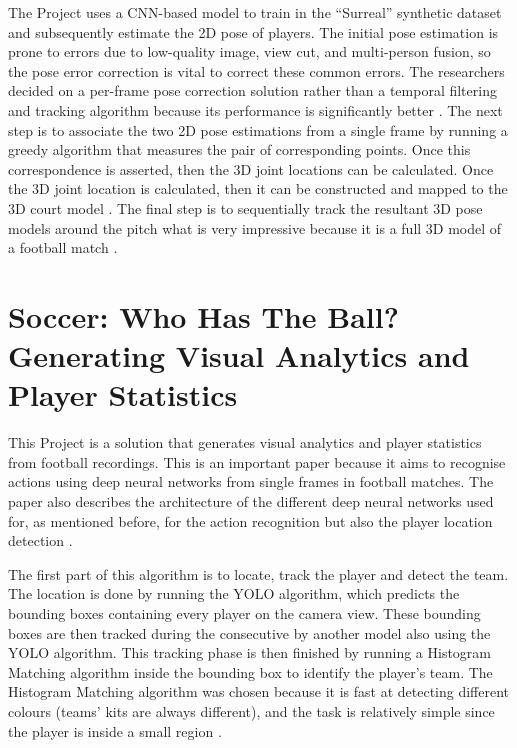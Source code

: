 \documentclass[
11pt,
twoside
]{report}
\begin{document}
The Project uses a CNN-based model to train in the ``Surreal'' synthetic dataset \cite{surreal} and subsequently estimate the 2D pose of players.
The initial pose estimation is prone to errors due to low-quality image, view cut, and multi-person fusion, so the pose error correction is vital to correct these common errors. The researchers decided on a per-frame pose correction solution rather than a temporal filtering and tracking algorithm because its performance is significantly better \cite{cvpr_2019}.
The next step is to associate the two 2D pose estimations from a single frame by running a greedy algorithm that measures the pair of corresponding points. Once this correspondence is asserted, then the 3D joint locations can be calculated. Once the 3D joint location is calculated, then it can be constructed and mapped to the 3D court model \cite{cvpr_2019}.
The final step is to sequentially track the resultant 3D pose models around the pitch what is very impressive because it is a full 3D model of a football match \cite{cvpr_2019}.






\section{Soccer: Who Has The Ball? Generating Visual Analytics and Player Statistics}


This Project is a solution that generates visual analytics and player statistics from football recordings. This is an important paper because it aims to recognise actions using deep neural networks from single frames in football matches. The paper also describes the architecture of the different deep neural networks used for, as mentioned before, for the action recognition but also the player location detection \cite{cvpr_2018}.




The first part of this algorithm is to locate, track the player and detect the team. The location is done by running the YOLO algorithm, which predicts the bounding boxes containing every player on the camera view. These bounding boxes are then tracked during the consecutive by another model also using the YOLO algorithm. This tracking phase is then finished by running a Histogram Matching algorithm inside the bounding box to identify the player's team. The Histogram Matching algorithm was chosen because it is fast at detecting different colours (teams' kits are always different), and the task is relatively simple since the player is inside a small region \cite{cvpr_2018}.
\end{document}
